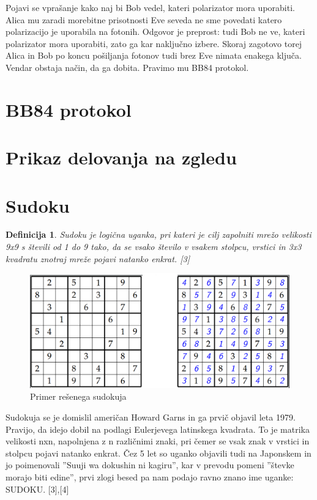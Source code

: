 \documentclass[A4paper, 11pt]{article}
\newtheorem{definicija}{Definicija}
\begin{document}
Pojavi se vprašanje kako naj bi Bob vedel, kateri polarizator mora uporabiti. Alica mu zaradi morebitne prisotnosti Eve seveda ne sme povedati katero polarizacijo je uporabila na fotonih. Odgovor je preprost: tudi Bob ne ve, kateri polarizator mora uporabiti, zato ga kar naključno izbere. Skoraj zagotovo torej Alica in Bob po koncu pošiljanja fotonov tudi brez Eve nimata enakega ključa. Vendar obstaja način, da ga dobita. Pravimo mu BB84 protokol.



\section{BB84 protokol}


\section{Prikaz delovanja na zgledu}



\section{Sudoku}

\begin{definicija}
Sudoku je logična uganka, pri kateri je cilj zapolniti mrežo velikosti 9x9 s števili od 1 do 9 tako, da se vsako število v vsakem stolpcu, vrstici in 3x3 kvadratu znotraj mreže pojavi natanko enkrat. [3]
\end{definicija}

\begin{figure}[h]
\centering
\caption{Primer rešenega sudokuja}
\includegraphics[scale=0.4]{sudoku_resen}
\end{figure}

Sudokuja se je domislil američan Howard Garns in ga prvič objavil leta 1979. Pravijo, da idejo dobil na podlagi Eulerjevega latinskega kvadrata. To je matrika velikosti nxn, napolnjena z n različnimi znaki, pri čemer se vsak znak v vrstici in stolpcu pojavi natanko enkrat. Čez 5 let so uganko objavili tudi na Japonskem in jo poimenovali ''Suuji wa dokushin ni kagiru'', kar v prevodu pomeni ''števke morajo biti edine'', prvi zlogi besed pa nam podajo ravno znano ime uganke: SUDOKU. [3],[4]
\end{document}
